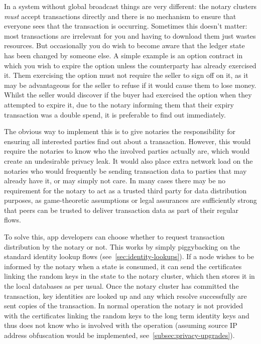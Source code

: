 \documentclass{article}
\begin{document}
In a system without global broadcast things are very different: the notary clusters \emph{must} accept transactions
directly and there is no mechanism to ensure that everyone sees that the transaction is occurring. Sometimes this
doesn't matter: most transactions are irrelevant for you and having to download them just wastes resources. But
occasionally you do wish to become aware that the ledger state has been changed by someone else. A simple example
is an option contract in which you wish to expire the option unless the counterparty has already exercised it. Them
exercising the option must not require the seller to sign off on it, as it may be advantageous for the seller to
refuse if it would cause them to lose money. Whilst the seller would discover if the buyer had exercised the option
when they attempted to expire it, due to the notary informing them that their expiry transaction was a double
spend, it is preferable to find out immediately.

The obvious way to implement this is to give notaries the responsibility for ensuring all interested parties find
out about a transaction. However, this would require the notaries to know who the involved parties actually are,
which would create an undesirable privacy leak. It would also place extra network load on the notaries who would
frequently be sending transaction data to parties that may already have it, or may simply not care. In many cases
there may be no requirement for the notary to act as a trusted third party for data distribution purposes, as
game-theoretic assumptions or legal assurances are sufficiently strong that peers can be trusted to deliver
transaction data as part of their regular flows.

To solve this, app developers can choose whether to request transaction distribution by the notary or not. This
works by simply piggybacking on the standard identity lookup flows (see~\cref{sec:identity-lookups}). If a node
wishes to be informed by the notary when a state is consumed, it can send the certificates linking the random keys
in the state to the notary cluster, which then stores it in the local databases as per usual. Once the notary
cluster has committed the transaction, key identities are looked up and any which resolve successfully are sent
copies of the transaction. In normal operation the notary is not provided with the certificates linking the random
keys to the long term identity keys and thus does not know who is involved with the operation (assuming source IP
address obfuscation would be implemented, see~\cref{subsec:privacy-upgrades}).
\end{document}
